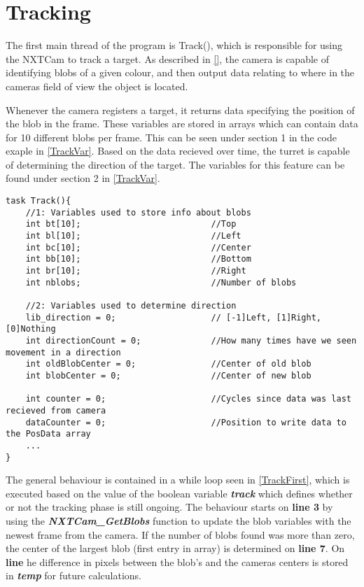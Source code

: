 \section{Tracking}
The first main thread of the program is Track(), which is responsible for using
the NXTCam to track a target. As described in \autoref{}, the camera is capable
of identifying blobs of a given colour, and then output data relating to where
in the cameras field of view the object is located.\nl

Whenever the camera registers a target, it returns data specifying the position
of the blob in the frame. These variables are stored in arrays which can
contain data for 10 different blobs per frame. This can be seen under section 1
in the code exaple in \autoref{TrackVar}. Based on the data recieved over time,
the turret is capable of determining the direction of the target. The variables
for this feature can be found under section 2 in \autoref{TrackVar}.
 
\begin{minipage}[H]{\linewidth}
\begin{lstlisting}[caption = Variables used on the Track() thread., label = TrackVar, style = nc] 
task Track(){
    //1: Variables used to store info about blobs
    int bt[10];                          //Top
    int bl[10];                          //Left
    int bc[10];                          //Center
    int bb[10];                          //Bottom
    int br[10];                          //Right
    int nblobs;                          //Number of blobs

    //2: Variables used to determine direction
    lib_direction = 0;                   // [-1]Left, [1]Right, [0]Nothing
    int directionCount = 0;              //How many times have we seen movement in a direction
    int oldBlobCenter = 0;               //Center of old blob
    int blobCenter = 0;                  //Center of new blob

    int counter = 0;                     //Cycles since data was last recieved from camera
    dataCounter = 0;                     //Position to write data to the PosData array
    ...
}
\end{lstlisting}
\end{minipage}

The general behaviour is contained in a while loop seen in \autoref{TrackFirst},
which is executed based on the value of the boolean variable
\textbf{\textit{track}} which defines whether or not the tracking phase is still
ongoing. The behaviour starts on \textbf{line 3} by using the
\textbf{\textit{NXTCam\_GetBlobs}} function to update the blob variables with
the newest frame from the camera. If the number of blobs found was more than
zero, the center of the largest blob (first entry in array) is determined on
\textbf{line 7}. On \textbf{line } he difference in pixels between the blob's
and the cameras centers is stored in \textbf{\textit{temp}} for future
calculations.\nl
  
